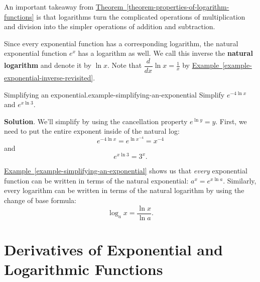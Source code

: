 \documentclass[10pt,]{book}
\newcommand{\terminology}[1]{\textbf{#1}}
\numberwithin{equation}{section}
\newcommand{\dv}[3][]{\dfrac{d^{#1} #2}{d #3^{#1}}}
\begin{document}
\hypertarget{p-221}{}%
An important takeaway from \hyperref[theorem-properties-of-logarithm-functions]{Theorem~\ref{theorem-properties-of-logarithm-functions}} is that logarithms turn the complicated operations of multiplication and division into the simpler operations of addition and subtraction.%
\par
\hypertarget{p-222}{}%
Since every exponential function has a corresponding logarithm, the natural exponential function \(e^{x}\) has a logarithm as well. We call this inverse the \terminology{natural logarithm} and denote it by \(\ln x\). Note that \(\dv{}{x}\ln x = \frac{1}{x}\) by \hyperref[example-exponential-inverse-revisited]{Example~\ref{example-exponential-inverse-revisited}}.%
\begin{example}{Simplifying an exponential.}{example-simplifying-an-exponential}%
\hypertarget{p-223}{}%
Simplify \(e^{-4\ln x}\) and \(e^{x\ln3}\).%
\par\smallskip%
\noindent\textbf{Solution}.\hypertarget{solution-48}{}\quad%
\hypertarget{p-224}{}%
We'll simplify by using the cancellation property \(e^{\ln y} = y\). First, we need to put the entire exponent inside of the natural log:%
\begin{equation*}
e^{-4\ln x} = e^{\ln x^{-4}} = x^{-4}
\end{equation*}
and%
\begin{equation*}
e^{x\ln3} = 3^{x}.
\end{equation*}
%
\end{example}
\hypertarget{p-225}{}%
\hyperref[example-simplifying-an-exponential]{Example~\ref{example-simplifying-an-exponential}} shows us that \emph{every} exponential function can be written in terms of the natural exponential: \(a^{x} = e^{x\ln a}\). Similarly, every logarithm can be written in terms of the natural logarithm by using the change of base formula:%
\begin{equation*}
\log_{a}x = \frac{\ln x}{\ln a}.
\end{equation*}
%
%
%
\typeout{************************************************}
\typeout{************************************************}
%
\section[{Derivatives of Exponential and Logarithmic Functions}]{Derivatives of Exponential and Logarithmic Functions}\label{section-derivatives-of-exponential-and-logarithmic-functions}
%
%
\typeout{************************************************}
\typeout{************************************************}
%
\end{document}
